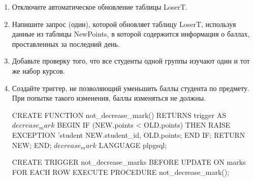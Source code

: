 \documentclass[10pt, a4paper]{article}
\begin{document}
\begin{enumerate}
{	}

	\item {Отключите автоматическое обновление таблицы LoserT.

	}

	\item {Напишите запрос (один), которой обновляет таблицу LoserT, используя данные из таблицы NewPoints, в которой содержится информация о баллах, проставленных за последний день.

	}

	\item {Добавьте проверку того, что все студенты одной группы изучают один и тот же набор курсов.

	}

	\item {Создайте триггер, не позволяющий уменьшить баллы студента по предмету. При попытке такого изменения, баллы изменяться не должны.

	\begin{sql}
CREATE FUNCTION not_decrease_mark() RETURNS trigger AS $decrease_mark$ 
BEGIN 
	IF (NEW.points < OLD.points) THEN	
		RAISE EXCEPTION 'student %
		NEW.student_id, OLD.points;
	END IF;
	RETURN NEW;
END; 
$decrease_mark$ LANGUAGE plpgsql;

CREATE TRIGGER not_decrease_marks BEFORE UPDATE ON marks
	FOR EACH ROW EXECUTE PROCEDURE not_decrease_mark();
	\end{sql}
	}

\end{enumerate}
\end{document}
